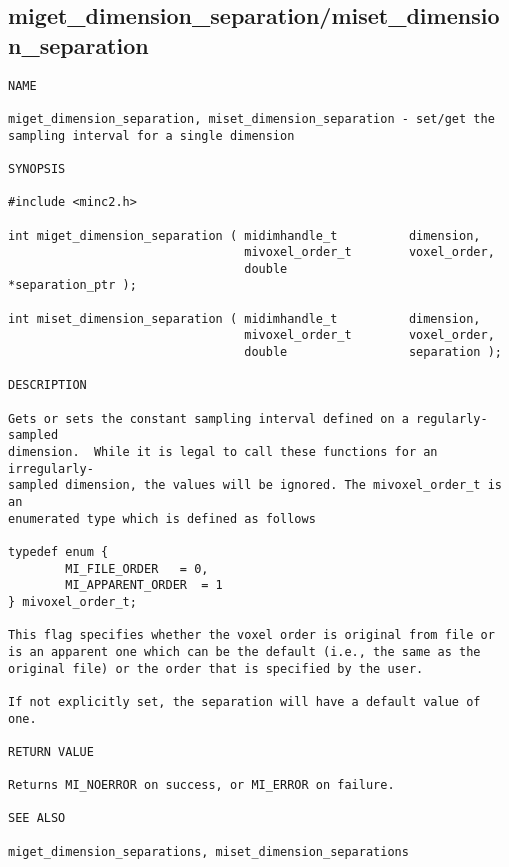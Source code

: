\documentclass{article}
\begin{document}
\subsection{miget\_dimension\_separation/miset\_dimension\_separation}
\begin{verbatim}
NAME

miget_dimension_separation, miset_dimension_separation - set/get the 
sampling interval for a single dimension

SYNOPSIS

#include <minc2.h>

int miget_dimension_separation ( midimhandle_t          dimension,
                                 mivoxel_order_t        voxel_order,
                                 double                 *separation_ptr );

int miset_dimension_separation ( midimhandle_t          dimension,
                                 mivoxel_order_t        voxel_order,
                                 double                 separation );

DESCRIPTION

Gets or sets the constant sampling interval defined on a regularly-sampled
dimension.  While it is legal to call these functions for an irregularly-
sampled dimension, the values will be ignored. The mivoxel_order_t is an 
enumerated type which is defined as follows

typedef enum {
        MI_FILE_ORDER   = 0,
        MI_APPARENT_ORDER  = 1
} mivoxel_order_t;

This flag specifies whether the voxel order is original from file or
is an apparent one which can be the default (i.e., the same as the 
original file) or the order that is specified by the user.

If not explicitly set, the separation will have a default value of one.

RETURN VALUE

Returns MI_NOERROR on success, or MI_ERROR on failure.

SEE ALSO

miget_dimension_separations, miset_dimension_separations
\end{verbatim}
\end{document}
